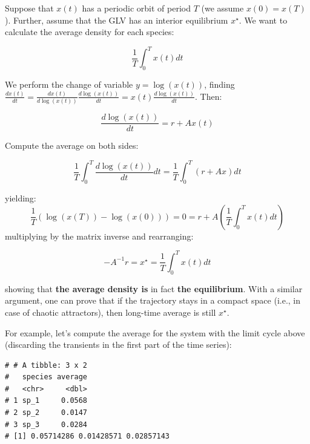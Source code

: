 \documentclass[
]{book}
\newenvironment{Shaded}{\begin{snugshade}}{\end{snugshade}}
\newcommand{\CommentTok}[1]{\textcolor[rgb]{0.56,0.35,0.01}{\textit{#1}}}
\newcommand{\DataTypeTok}[1]{\textcolor[rgb]{0.13,0.29,0.53}{#1}}
\newcommand{\DecValTok}[1]{\textcolor[rgb]{0.00,0.00,0.81}{#1}}
\newcommand{\KeywordTok}[1]{\textcolor[rgb]{0.13,0.29,0.53}{\textbf{#1}}}
\newcommand{\NormalTok}[1]{#1}
\newcommand{\OperatorTok}[1]{\textcolor[rgb]{0.81,0.36,0.00}{\textbf{#1}}}
\newcommand{\StringTok}[1]{\textcolor[rgb]{0.31,0.60,0.02}{#1}}
\begin{document}
Suppose that \(x(t)\) has a periodic orbit of period \(T\) (we assume \(x(0) = x(T)\)). Further, assume that the GLV has an interior equilibrium \(x^\star\). We want to calculate the average density for each species:

\[
\frac{1}{T} \int_0^T x(t) dt
\]

We perform the change of variable \(y = \log(x(t))\), finding \(\frac{d x(t)}{dt} = \frac{d x(t)}{d \log(x(t))}\frac{d \log(x(t))}{dt} = x(t)\frac{d \log(x(t))}{dt}\). Then:

\[
\frac{d \log(x(t))}{dt} = r + Ax(t)
\]

Compute the average on both sides:

\[
\frac{1}{T}\int_0^T \frac{d \log(x(t))}{dt} dt= \frac{1}{T}\int_0^T \left(r + Ax \right) dt
\]

yielding:
\[
\frac{1}{T}(\log(x(T)) - \log(x(0))) = 0 = r + A \left( \frac{1}{T} \int_0^T x(t) dt \right)
\]
multiplying by the matrix inverse and rearranging:

\[
-A^{-1} r = x^\star =  \frac{1}{T} \int_0^T x(t) dt 
\]

showing that \textbf{the average density is} in fact \textbf{the equilibrium}. With a similar argument, one can prove that if the trajectory stays in a compact space (i.e., in case of chaotic attractors), then long-time average is still \(x^\star\).

For example, let's compute the average for the system with the limit cycle above (discarding the transients in the first part of the time series):

\begin{Shaded}
\end{Shaded}

\begin{verbatim}
# # A tibble: 3 x 2
#   species average
#   <chr>     <dbl>
# 1 sp_1     0.0568
# 2 sp_2     0.0147
# 3 sp_3     0.0284
# [1] 0.05714286 0.01428571 0.02857143
\end{verbatim}
\end{document}
